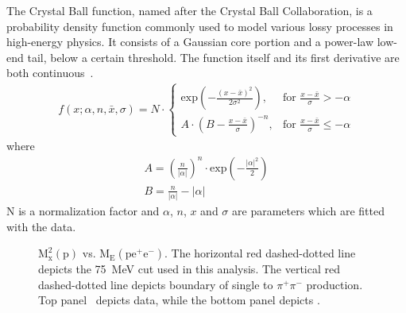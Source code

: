 The Crystal Ball function, named after the Crystal Ball Collaboration, is a probability density function commonly used to model various lossy processes in high-energy physics. It consists of a Gaussian core portion and a power-law low-end tail, below a certain threshold. The function itself and its first derivative are both continuous~\cite{CBjlab}. 
\begin{align}
f(x;\alpha,n,\bar{x},\sigma)=N\cdot
\begin{cases}
\mathrm{exp}(-\frac{(x-\bar{x})^2}{2 \sigma^2}), & \text{for }\frac{x-\bar{x}}{\sigma}>-\alpha \\
A \cdot (B - \frac{x-\bar{x}}{\sigma})^{-n}, & \text{for }\frac{x-\bar{x}}{\sigma} \le -\alpha
\end{cases}
\end{align}
where
\begin{align}
A = \left( \frac{n}{\left| \alpha \right|}\right)^n \cdot \mathrm{exp} \left( - \frac{\left| \alpha \right|^2}{2}\right) \nonumber  \\
B=\frac{n}{\left| \alpha \right|} - \left| \alpha \right|
\end{align}
N is a normalization factor and $\alpha$, $n$, $x$ and $\sigma$ are parameters which are fitted with the data.
\begin{figure}[h!]\begin{center}
		
		\caption[$\mathrm{M_x^2(\gamma p \to p X)}$ vs. $\mathrm{M_E(\gamma p \to pe^+e^- X)}$]{\label{kinefit.mm2p.mE.data.MC}$\mathrm{M_x^2(p)}$ vs. $\mathrm{M_E(pe^+e^-)}$. The horizontal red dashed-dotted line depicts the 75~MeV cut used in this analysis. The vertical red dashed-dotted line depicts boundary of single \pizT to $\pi^+\pi^-$  production. Top panel~ depicts data, while the bottom panel  depicts .}
		
	\end{center}\end{figure}
